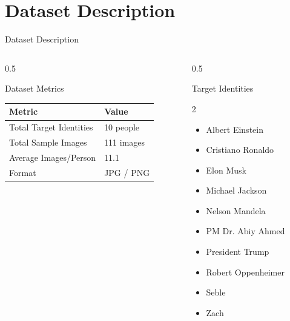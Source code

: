 \documentclass[aspectratio=169]{beamer}
\begin{document}
\section{Dataset Description}

\begin{frame}{Dataset Description}
  \begin{columns}
    \begin{column}{0.5\textwidth}
      \begin{block}{Dataset Metrics}
        \begin{tabular}{ll}
          \toprule
          \textbf{Metric} & \textbf{Value}\\
          \midrule
          Total Target Identities & 10 people\\
          Total Sample Images & 111 images\\
          Average Images/Person & 11.1\\
          Format & JPG / PNG\\
          \bottomrule
        \end{tabular}
      \end{block}
    \end{column}
    \begin{column}{0.5\textwidth}
      \begin{block}{Target Identities}
        \begin{multicols}{2}
          \begin{itemize}\footnotesize
            \item Albert Einstein
            \item Cristiano Ronaldo
            \item Elon Musk
            \item Michael Jackson
            \item Nelson Mandela
            \item PM Dr. Abiy Ahmed
            \item President Trump
            \item Robert Oppenheimer
            \item Seble
            \item Zach
          \end{itemize}
        \end{multicols}
      \end{block}
    \end{column}
  \end{columns}
\end{frame}
\end{document}
